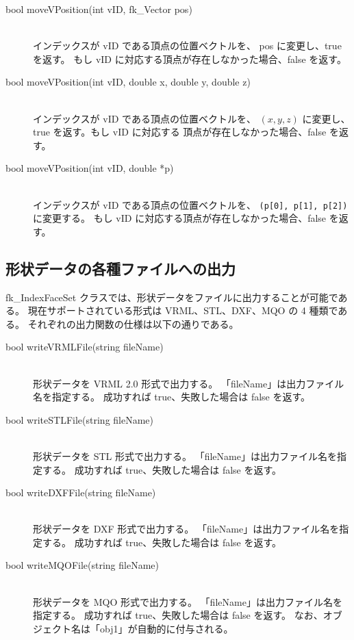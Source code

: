 \begin{description}
\item[bool moveVPosition(int vID, fk\_Vector pos)] ~ \\
	インデックスが vID である頂点の位置ベクトルを、
	pos に変更し、true を返す。
	もし vID に対応する頂点が存在しなかった場合、false を返す。\\

\item[bool moveVPosition(int vID, double x, double y, double z)] ~ \\
	インデックスが vID である頂点の位置ベクトルを、
	\((x, y, z)\) に変更し、true を返す。もし vID に対応する
	頂点が存在しなかった場合、false を返す。\\

\item[bool moveVPosition(int vID, double *p)] ~ \\
	インデックスが vID である頂点の位置ベクトルを、
	\verb+(p[0], p[1], p[2])+ に変更する。
	もし vID に対応する頂点が存在しなかった場合、false を返す。

\end{description}

\subsection{形状データの各種ファイルへの出力}
fk\_IndexFaceSet クラスでは、形状データをファイルに出力することが可能である。
現在サポートされている形式は VRML、STL、DXF、MQO の 4 種類である。
それぞれの出力関数の仕様は以下の通りである。
\begin{description}
\item[bool writeVRMLFile(string fileName)] ~ \\
	形状データを VRML 2.0 形式で出力する。
	「fileName」は出力ファイル名を指定する。
	成功すれば true、失敗した場合は false を返す。\\

\item[bool writeSTLFile(string fileName)] ~ \\
	形状データを STL 形式で出力する。
	「fileName」は出力ファイル名を指定する。
	成功すれば true、失敗した場合は false を返す。\\

\item[bool writeDXFFile(string fileName)] ~ \\
	形状データを DXF 形式で出力する。
	「fileName」は出力ファイル名を指定する。
	成功すれば true、失敗した場合は false を返す。\\

\item[bool writeMQOFile(string fileName)] ~ \\
	形状データを MQO 形式で出力する。
	「fileName」は出力ファイル名を指定する。
	成功すれば true、失敗した場合は false を返す。
	なお、オブジェクト名は「obj1」が自動的に付与される。
\end{description}

